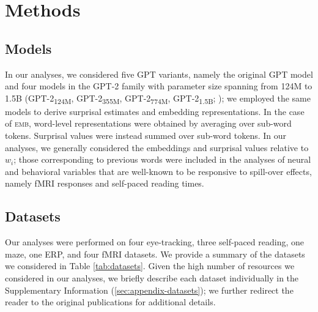 \documentclass[11pt]{article}
\begin{document}
\section{Methods} \label{sec:methods}

\subsection{Models}

In our analyses, we considered five GPT variants, namely the original GPT model \citep{gpt} and four models in the GPT-2 family with parameter size spanning from 124M to 1.5B (GPT-2\textsubscript{124M}, GPT-2\textsubscript{355M}, GPT-2\textsubscript{774M}, GPT-2\textsubscript{1.5B}; \citealp{gpt2}); we employed the same models to derive surprisal estimates and embedding representations. In the case of \textsc{emb}, word-level representations were obtained by averaging over sub-word tokens. Surprisal values were instead summed over sub-word tokens. In our analyses, we generally considered the embeddings and surprisal values relative to $w_i$; those corresponding to previous words were included in the analyses of neural and behavioral variables that are well-known to be responsive to spill-over effects, namely fMRI responses and self-paced reading times.

\subsection{Datasets}

Our analyses were performed on four eye-tracking, three self-paced reading, one maze, one ERP, and four fMRI datasets. We provide a summary of the datasets we considered in Table \ref{tab:datasets}. Given the high number of resources we considered in our analyses, we briefly describe each dataset individually in the Supplementary Information (\ref{sec:appendix-datasets}); we further redirect the reader to the original publications for additional details.

\medskip 
\end{document}
